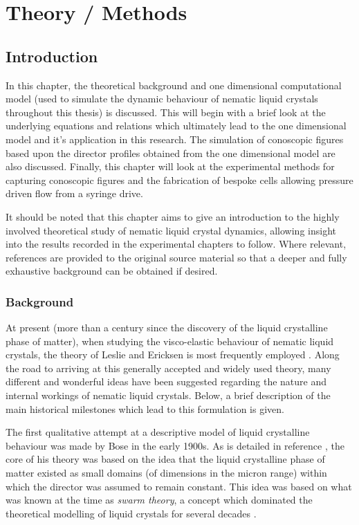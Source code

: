 \chapter{Theory / Methods}
\label{sec:theory}
\section{Introduction}
In this chapter, the theoretical background and one dimensional computational model (used to simulate the dynamic behaviour of nematic liquid crystals throughout this thesis) is discussed. This will begin with a brief look at the underlying equations and relations which ultimately lead to the one dimensional model and it's application in this research. The simulation of conoscopic figures based upon the director profiles obtained from the one dimensional model are also discussed. Finally, this chapter will look at the experimental methods for capturing conoscopic figures and the fabrication of bespoke cells allowing pressure driven flow from a syringe drive.

It should be noted that this chapter aims to give an introduction to the highly involved theoretical study of nematic liquid crystal dynamics, allowing insight into the results recorded in the experimental chapters to follow. Where relevant, references are provided to the original source material so that a deeper and fully exhaustive background can be obtained if desired.

\subsection{Background}
At present (more than a century since the discovery of the liquid crystalline phase of matter), when studying the visco-elastic behaviour of nematic liquid crystals, the theory of Leslie and Ericksen is most frequently employed \cite{Taylor1999}. Along the road to arriving at this generally accepted and widely used theory, many different and wonderful ideas have been suggested regarding the nature and internal workings of nematic liquid crystals. Below, a brief description of the main historical milestones which lead to this formulation is given.

The first qualitative attempt at a descriptive model of liquid crystalline behaviour was made by Bose in the early 1900s. As is detailed in reference \cite{Taylor1999}, the core of his theory was based on the idea that the liquid crystalline phase of matter existed as small domains (of dimensions in the micron range) within which the director was assumed to remain constant. This idea was based on what was known at the time as \textit{swarm theory}, a concept which dominated the theoretical modelling of liquid crystals for several decades \cite{Taylor1999}.

